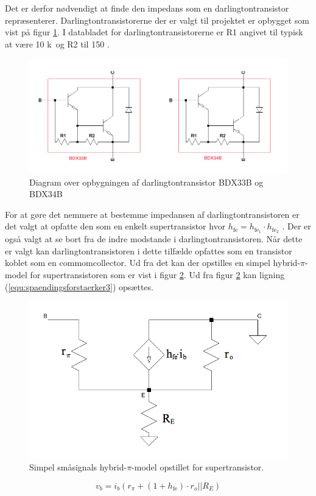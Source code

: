 Det er derfor nødvendigt at finde den impedans som en darlingtontransistor  repræsenterer. Darlingtontransistorerne der er valgt til projektet er opbygget som vist på figur \ref{darlington_diagram}. I databladet for darlingtontransistorerne \cite{bdx33-34-datablad} er R1 angivet til typisk at være 10 k\ohm~og R2 til 150 \ohm.

\begin{figure}[h]
\centering
\includegraphics[scale = 0.4]{teknisk/effektforstaerker/darlingtontransistor_opbygning.png}
\caption{Diagram over opbygningen af darlingtontransistor BDX33B og BDX34B}
\label{darlington_diagram}
\end{figure}

For at gøre det nemmere at bestemme impedansen af darlingtontransistoren er det valgt at opfatte den som en enkelt supertransistor hvor $h_{\mathrm{fe}}= h_{\mathrm{fe}_1} \cdot h_{\mathrm{fe}_2}$ \cite{sedra-smith}. %
Der er også valgt at se bort fra de indre modstande i darlingtontransistoren. Når dette er valgt kan darlingtontransistoren i dette tilfælde opfattes som en transistor koblet som en commomcollector. Ud fra det kan der opstilles en simpel hybrid-$\pi$-model for supertransistoren som er vist i figur \ref{hybridpimodel_darlington}. Ud fra figur \ref{hybridpimodel_darlington} kan ligning (\ref{equ:spaendingsforstaerker3}) opsættes.

\begin{figure}[h]
\centering
\includegraphics[scale=0.3]{teknisk/effektforstaerker/hybridpimodel.png}
\caption{Simpel småsignals hybrid-$\pi$-model  opstillet for supertransistor.}
\label{hybridpimodel_darlington}
\end{figure}
\begin{equation}
\label{equ:spaendingsforstaerker3}
v_b = i_b (r_{\pi} + (1+h_{\mathrm{fe}}) \cdot r_o||R_E) 
\end{equation}

